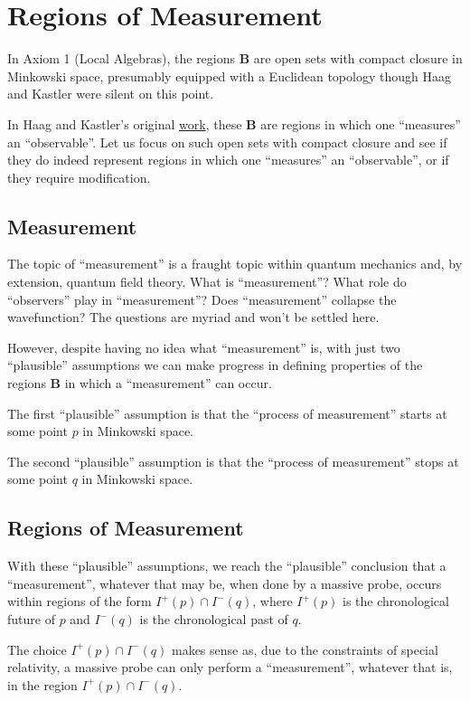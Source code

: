 \section{Regions of Measurement}\label{sctn:regions-of-measurement}
In Axiom 1 (Local Algebras), the regions $\mathbf{B}$ are open sets with compact closure in Minkowski space, presumably equipped with a Euclidean topology though Haag and Kastler were silent on this point.

In Haag and Kastler's original \href{https://doi.org/10.1063/1.1704187}{work}, these $\mathbf{B}$ are regions in which one ``measures'' an ``observable''. Let us focus on such open sets with compact closure and see if they do indeed represent regions in which one ``measures'' an ``observable'', or if they require modification.

\subsection{Measurement}
The topic of ``measurement'' is a fraught topic within quantum mechanics and, by extension, quantum field theory. What is ``measurement''? What role do ``observers'' play in ``measurement''? Does ``measurement'' collapse the wavefunction? The questions are myriad and won't be settled here.

However, despite having no idea what ``measurement'' is, with just two ``plausible'' assumptions we can make progress in defining properties of the regions  $\mathbf{B}$ in which a ``measurement'' can occur.

The first ``plausible'' assumption is that the ``process of measurement'' starts at some point $p$ in Minkowski space.

The second ``plausible'' assumption is that the ``process of measurement'' stops at some point $q$ in Minkowski space.

\subsection{Regions of Measurement}
With these ``plausible'' assumptions, we reach the ``plausible'' conclusion that a ``measurement'', whatever that may be, when done by a massive probe, occurs within regions of the form $I^+(p) \cap I^-(q)$, where $I^+(p)$ is the chronological future of $p$ and $I^-(q)$ is the chronological past of $q$.

The choice $I^+(p) \cap I^-(q)$ makes sense as, due to the constraints of special relativity, a massive probe can only perform a ``measurement'', whatever that is, in the region $I^+(p) \cap I^-(q)$.

